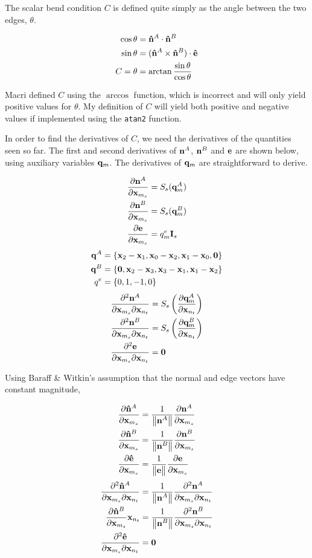 \documentclass[twocolumn]{article}
\newcommand{\norm}[1]{\begin{Vmatrix}#1\end{Vmatrix}}
\newcommand{\pfrac}[2]{
    \frac{\partial #1}{\partial #2}
}
\newcommand{\pfractwo}[3]{
    \frac{\partial^2 #1}{\partial #2 \partial #3}
}
\newcommand{\cross}{\times}
\newcommand{\Is}{{\bf I}_s}
\newcommand{\x}{{\bf x}}
\newcommand{\xms}{\x_{m_s}}
\newcommand{\xnt}{\x_{n_t}}
\newcommand{\n}{{\bf n}}
\newcommand{\nhat}{{\bf {\hat n}}}
\newcommand{\e}{{\bf e}}
\newcommand{\ehat}{{\bf {\hat e}}}
\newcommand{\q}{{\bf q}}
\begin{document}
The scalar bend condition $C$ is defined quite simply as the angle between
the two edges, $\theta$.

\begin{align}
\label{eq:costh}
\cos \theta &= \nhat^A \cdot \nhat^B \\
\label{eq:sinth}
\sin \theta &= (\nhat^A \cross \nhat^B) \cdot \ehat \\
\label{eq:theta}
C = \theta &= \arctan \frac{\sin \theta}{\cos \theta}
\end{align}

Macri defined $C$ using the $\arccos$ function, which is incorrect and will
only yield positive values for $\theta$. My definition of $C$ will yield
both positive and negative values if implemented using the {\tt atan2} function.

In order to find the derivatives of $C$, we need the derivatives
of the quantities seen so far. The first and second derivatives of
$\n^A$, $\n^B$ and $\e$ are shown below, using auxiliary variables
$\q_m$. The derivatives of $\q_m$ are straightforward to derive.

\begin{align}
\pfrac{\n^A}{\xms} &= S_s(\q^A_m) \\
\pfrac{\n^B}{\xms} &= S_s(\q^B_m) \\
\pfrac{\e}{\xms} &= q^e_m \Is
\end{align}
\begin{align}
\q^A &= \{ \x_2 - \x_1, \x_0 - \x_2, \x_1 - \x_0, {\bf 0} \} \\
\q^B &= \{ {\bf 0}, \x_2 - \x_3, \x_3 - \x_1, \x_1 - \x_2 \} \\
q^e &= \{ 0, 1, -1, 0 \}
\end{align}
\begin{align}
\pfractwo{\n^A}{\xms}{\xnt} &= S_s\left(\pfrac{\q^A_m}{\xnt}\right) \\
\pfractwo{\n^B}{\xms}{\xnt} &= S_s\left(\pfrac{\q^B_m}{\xnt}\right) \\
\pfractwo{\e}{\xms}{\xnt} &= {\bf 0}
\end{align}

Using Baraff \& Witkin's assumption that the normal and edge vectors have
constant magnitude,

\begin{align}
\label{eq:dn}
\pfrac{\nhat^A}{\xms} &=
    \frac{1}{\norm{\n^A}} \pfrac{\n^A}{\xms} \\
\pfrac{\nhat^B}{\xms} &=
    \frac{1}{\norm{\n^B}} \pfrac{\n^B}{\xms} \\
\pfrac{\ehat}{\xms} &=
    \frac{1}{\norm{\e}} \pfrac{\e}{\xms}
\end{align}
\begin{align}
\label{eq:d2n}
\pfractwo{\nhat^A}{\xms}{\xnt} &=
    \frac{1}{\norm{\n^A}} \pfractwo{\n^A}{\xms}{\xnt} \\
\pfrac{\nhat^B}{\xms}{\xnt} &=
    \frac{1}{\norm{\n^B}} \pfractwo{\n^B}{\xms}{\xnt} \\
\pfractwo{\ehat}{\xms}{\xnt} &= {\bf 0}
\end{align}
\end{document}
